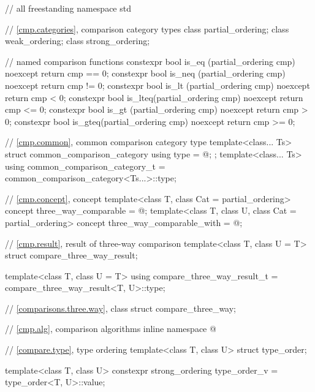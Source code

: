 %
%
%
%
%
%
%
%
%
\begin{codeblock}
// all freestanding
namespace std {
  // \ref{cmp.categories}, comparison category types
  class partial_ordering;
  class weak_ordering;
  class strong_ordering;

  // named comparison functions
  constexpr bool is_eq  (partial_ordering cmp) noexcept { return cmp == 0; }
  constexpr bool is_neq (partial_ordering cmp) noexcept { return cmp != 0; }
  constexpr bool is_lt  (partial_ordering cmp) noexcept { return cmp < 0; }
  constexpr bool is_lteq(partial_ordering cmp) noexcept { return cmp <= 0; }
  constexpr bool is_gt  (partial_ordering cmp) noexcept { return cmp > 0; }
  constexpr bool is_gteq(partial_ordering cmp) noexcept { return cmp >= 0; }

  // \ref{cmp.common}, common comparison category type
  template<class... Ts>
  struct common_comparison_category {
    using type = @\seebelow@;
  };
  template<class... Ts>
    using common_comparison_category_t = common_comparison_category<Ts...>::type;

  // \ref{cmp.concept}, concept 
  template<class T, class Cat = partial_ordering>
    concept three_way_comparable = @\seebelow@;
  template<class T, class U, class Cat = partial_ordering>
    concept three_way_comparable_with = @\seebelow@;

  // \ref{cmp.result}, result of three-way comparison
  template<class T, class U = T> struct compare_three_way_result;

  template<class T, class U = T>
    using compare_three_way_result_t = compare_three_way_result<T, U>::type;

  // \ref{comparisons.three.way}, class 
  struct compare_three_way;

  // \ref{cmp.alg}, comparison algorithms
  inline namespace @

  // \ref{compare.type}, type ordering
  template<class T, class U>
    struct type_order;

  template<class T, class U>
    constexpr strong_ordering type_order_v = type_order<T, U>::value;
}
\end{codeblock}

